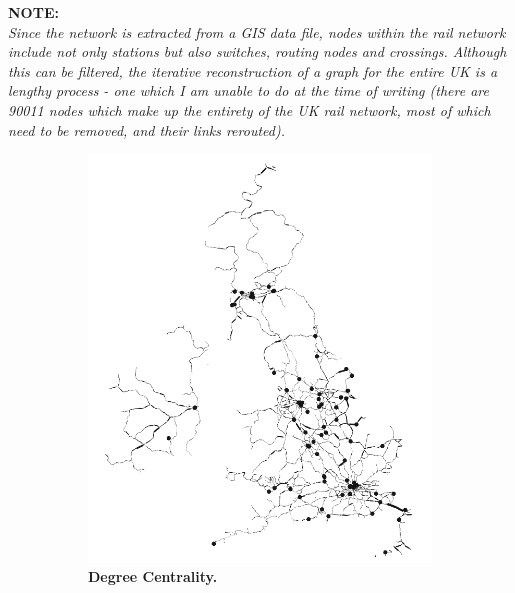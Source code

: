 \textbf{NOTE:}\\
\textit{Since the network is extracted from a GIS data file, nodes within the rail network include not only stations but also switches, routing nodes and crossings. Although this can be filtered, the iterative reconstruction of a graph for the entire UK is a lengthy process - one which I am unable to do at the time of writing (there are 90011 nodes which make up the entirety of the UK rail network, most of which need to be removed, and their links rerouted).}


\begin{figure}[H]
     \centering
\begin{subfigure}[b]{.49\textwidth}
     \centering
         \includegraphics[width=\textwidth]{rail/degree.png}
        \caption{ \textbf{Degree Centrality.}}
\end{subfigure}
\begin{subfigure}[b]{.49\textwidth}
     \centering

\end{subfigure}
\end{figure}
